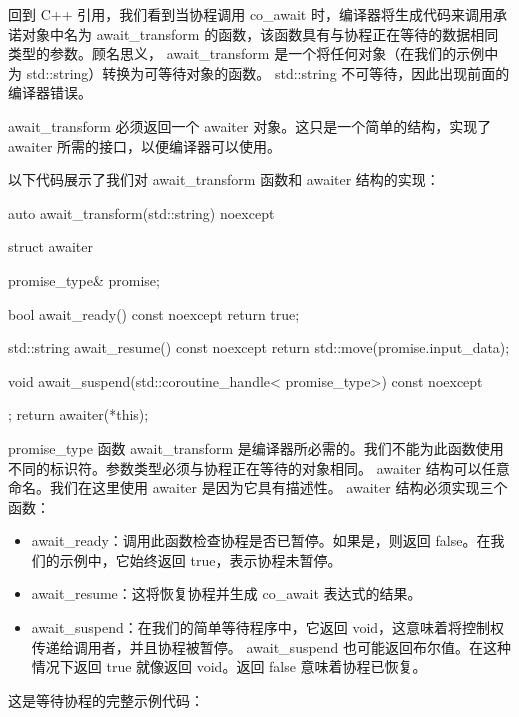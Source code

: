 回到 C++ 引用，我们看到当协程调用 co\_await 时，编译器将生成代码来调用承诺对象中名为 await\_transform 的函数，该函数具有与协程正在等待的数据相同类型的参数。顾名思义， await\_transform 是一个将任何对象（在我们的示例中为 std::string）转换为可等待对象的函数。 std::string 不可等待，因此出现前面的编译器错误。

await\_transform 必须返回一个 awaiter 对象。这只是一个简单的结构，实现了 awaiter 所需的接口，以便编译器可以使用。

以下代码展示了我们对 await\_transform 函数和 awaiter 结构的实现：

\begin{cpp}
auto await_transform(std::string) noexcept {
    struct awaiter {
        promise_type& promise;

        bool await_ready() const noexcept {
            return true;
        }

        std::string await_resume() const noexcept {
            return std::move(promise.input_data);
        }

        void await_suspend(std::coroutine_handle<
                           promise_type>) const noexcept {
        }
    };
    return awaiter(*this);
}
\end{cpp}

promise\_type 函数 await\_transform 是编译器所必需的。我们不能为此函数使用不同的标识符。参数类型必须与协程正在等待的对象相同。 awaiter 结构可以任意命名。我们在这里使用 awaiter 是因为它具有描述性。 awaiter 结构必须实现三个函数：

\begin{itemize}
\item
await\_ready：调用此函数检查协程是否已暂停。如果是，则返回 false。在我们的示例中，它始终返回 true，表示协程未暂停。

\item
await\_resume：这将恢复协程并生成 co\_await 表达式的结果。

\item
await\_suspend：在我们的简单等待程序中，它返回 void，这意味着将控制权传递给调用者，并且协程被暂停。 await\_suspend 也可能返回布尔值。在这种情况下返回 true 就像返回 void。返回 false 意味着协程已恢复。
\end{itemize}

这是等待协程的完整示例代码：

